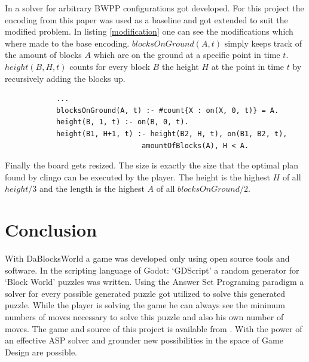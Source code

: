 \documentclass[runningheads]{llncs}
\begin{document}
        In \cite{originalEncodingPaper} a solver for arbitrary BWPP configurations got developed.
        For this project the encoding from this paper was used as a baseline and got extended to suit the modified problem.
        In listing \ref{modification} one can see the modifications which where made to the base encoding.\newline
        $blocksOnGround(A, t)$ simply keeps track of the amount of blocks $A$ which are on the ground at a specific point in time $t$.
        $height(B, H, t)$ counts for every block $B$ the height $H$ at the point in time $t$ by recursively adding the blocks up.

        \begin{lstlisting}[caption=Addition to the encoding, label=modification]
            %DEFINE
            ...
            blocksOnGround(A, t) :- #count{X : on(X, 0, t)} = A.
            height(B, 1, t) :- on(B, 0, t).
            height(B1, H+1, t) :- height(B2, H, t), on(B1, B2, t),
                                amountOfBlocks(A), H < A.
        \end{lstlisting}
        
        Finally the board gets resized.
        The size is exactly the size that the optimal plan found by clingo can be executed by the player.
        The height is the highest $H$ of all $height/3$ and the length is the highest $A$ of all $blocksOnGround/2$.

    \section{Conclusion}
        With DaBlocksWorld \cite{daBlocksWorldGithub} a game was developed only using open source tools and software.
        In the scripting language of Godot: `GDScript' a random generator for `Block World' puzzles was written.
        Using the Answer Set Programing paradigm a solver for every possible generated puzzle got utilized to solve this generated puzzle.
        While the player is solving the game he can always see the minimum numbers of moves necessary to solve this puzzle and also his own number of moves.
        The game and source of this project is available from \cite{daBlocksWorldGithub}.\newline
        With the power of an effective ASP solver and grounder new possibilities in the space of Game Design are possible. 
\end{document}
